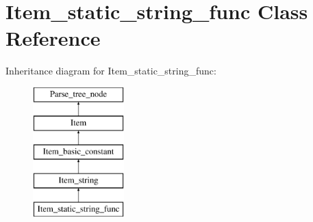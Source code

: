 \hypertarget{classItem__static__string__func}{}\section{Item\+\_\+static\+\_\+string\+\_\+func Class Reference}
\label{classItem__static__string__func}
Inheritance diagram for Item\+\_\+static\+\_\+string\+\_\+func\+:\begin{figure}[H]
\begin{center}
\leavevmode
\includegraphics[height=5.000000cm]{classItem__static__string__func}
\end{center}
\end{figure}
